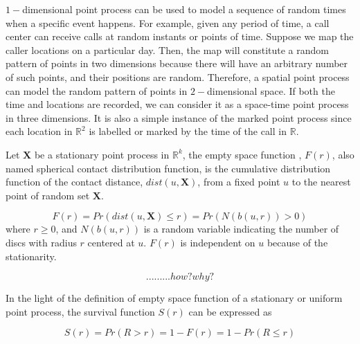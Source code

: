 $1-$dimensional point process can be used to model a sequence of
random times when a specific event happens. For example, given any
period of time, a call center can receive calls at random instants or
points of time. Suppose we map the caller locations on a particular
day. Then, the map will constitute a random pattern of points in two
dimensions because there will have an arbitrary number of such points,
and their positions are random. Therefore, a spatial point process can
model the random pattern of points in $2-$dimensional space. If both
the time and locations are recorded, we can consider it as a
space-time point process in three dimensions. It is also a simple
instance of the marked point process \cite{baddeley2007spatial} since
each location in $\mathbb{R}^2$ is labelled or marked by the time of
the call in $\mathbb{R}$.

Let $\bm{X}$ be a stationary point process in $\mathbb{R}^k$, the
empty space function \cite{baddeley2007spatial}, $F(r)$, also named
spherical contact distribution function, is the cumulative
distribution function of the contact distance, $dist(u, \bm{X})$, from
a fixed point $u$ to the nearest point of random set $\bm{X}$.

\begin{equation}\label{eq:empty_space_function}
  F(r) = Pr(dist(u, \bm{X}) \leq r) = Pr(N(b(u, r)) > 0)
\end{equation}
where $r \geq 0$, and $N(b(u, r))$ is a random variable indicating the
number of discs with radius $r$ centered at $u$. $F(r)$ is independent
on $u$ because of the stationarity.


$$......... how ? why ?$$



In the light of the definition of empty space function of a stationary
or uniform point process, the survival function $S(r)$ can be
expressed as

\begin{equation}\label{eq:sf_radius}
  S(r) = Pr(R > r) = 1 - F(r) = 1 - Pr(R \leq r)
\end{equation}





